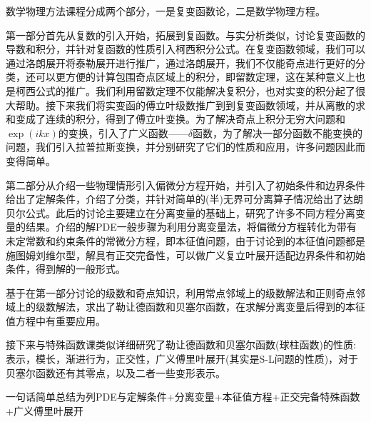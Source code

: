 数学物理方法课程分成两个部分，一是复变函数论，二是数学物理方程。
\setlength{\parindent}{2em}

第一部分首先从复数的引入开始，拓展到复函数。与实分析类似，讨论复变函数的导数和积分，并针对复函数的性质引入柯西积分公式。​在复变函数领域，我们可以通过洛朗展开将泰勒展开进行推广，通过洛朗展开，我们不仅能奇点进行更好的分类，还可以更方便的计算包围奇点区域上的积分，即留数定理，这在某种意义上也是柯西公式的推广。我们利用留数定理不仅能解决复积分，也对实变的积分起了很大帮助。接下来我们将实变函的傅立叶级数推广到到复变函数领域，并从离散的求和变成了连续的积分，得到了傅立叶变换。为了解决奇点上积分无穷大问题和$\exp(ikx)$的变换，引入了广义函数——$\delta$函数，为了解决一部分函数不能变换的问题，我们引入拉普拉斯变换，并分别研究了它们的性质和应用，许多问题因此而变得简单。

第二部分从介绍一些物理情形引入偏微分方程开始，并引入了初始条件和边界条件给出了定解条件，介绍了分类，并针对简单的(半)无界可分离算子情况给出了达朗贝尔公式。此后的讨论主要建立在分离变量的基础上，研究了许多不同方程分离变量的结果。介绍的解PDE一般步骤为利用分离变量法，将偏微分方程转化为带有未定常数和约束条件的常微分方程，即本征值问题，由于讨论到的本征值问题都是施图姆刘维尔型，解具有正交完备性，可以做广义复立叶展开适配边界条件和初始条件，得到解的一般形式。

基于在第一部分讨论的级数和奇点知识，利用常点邻域上的级数解法和正则奇点邻域上的级数解法，求出了勒让德函数和贝塞尔函数，在求解分离变量后得到的本征值方程中有重要应用。

接下来与特殊函数课类似详细研究了勒让德函数和贝塞尔函数(球柱函数)的性质:表示，模长，渐进行为，正交性，广义傅里叶展开(其实是S-L问题的性质)，对于贝塞尔函数还有其零点，以及二者一些变形表示。

一句话简单总结为列PDE与定解条件+分离变量+本征值方程+正交完备特殊函数+广义傅里叶展开



\setlength{\parindent}{0em}


​
